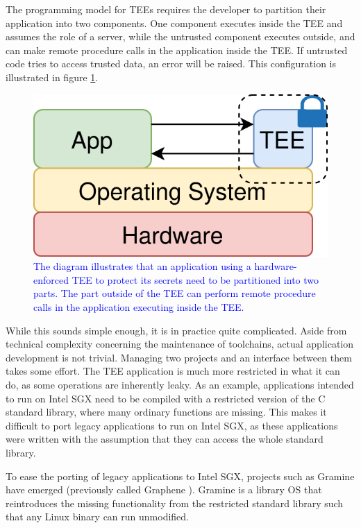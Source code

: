 The programming model for TEEs requires the developer to partition their application into two components. One component
executes inside the TEE and assumes the role of a server, while the untrusted component executes outside, and can make
remote procedure calls in the application inside the TEE. If untrusted code tries to access trusted
data, an error will be raised. This configuration is illustrated in figure \ref{graphics:tee}.

\begin{figure}
    \centering
    \includegraphics[scale=0.2]{graphics/tee.png}
    \caption{\textcolor{blue}{The diagram illustrates that an application using a hardware-enforced TEE to protect its secrets need to
    be partitioned into two parts. The part outside of the TEE can perform remote procedure calls in the application
    executing inside the TEE.}}
    \label{graphics:tee}
\end{figure}

While this sounds simple enough, it is in practice quite complicated. Aside from technical complexity
concerning the maintenance of toolchains, actual application development is not trivial. Managing two projects and an
interface between them takes some effort. The TEE application is much more restricted in what it can do, as some
operations are inherently leaky. As an example, applications intended to run on Intel SGX need to be compiled with a
restricted version of the C standard library, where many ordinary functions are missing. This makes it difficult to port
legacy applications to run on Intel SGX, as these applications were written with the assumption that they can access the
whole standard library.

To ease the porting of legacy applications to Intel SGX, projects such as Gramine have emerged (previously called
Graphene \cite{DBLP:conf/usenix/TsaiPV17}). Gramine is a library OS that reintroduces the missing functionality from the
restricted standard library such that any Linux binary can run unmodified.

